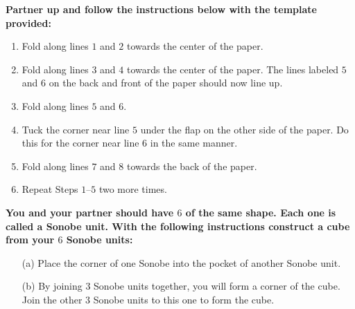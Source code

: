
\newcommand{\activityname}{
  Know When to Fold 'Em
}
\newcommand{\subtitle}{
  Ge-Origam-itry
}



\noindent \textbf{Partner up and follow the instructions below with the template provided:}

\begin{enumerate}
\item Fold along lines $1$ and $2$ towards the center of the paper.
\item Fold along lines $3$ and $4$ towards the center of the paper. The lines labeled $5$ and $6$ on the back and front of the paper should now line up.
\item Fold along lines $5$ and $6$. 
\item Tuck the corner near line $5$ under the flap on the other side of the paper. Do this for the corner near line $6$ in the same manner.
\item Fold along lines $7$ and $8$ towards the back of the paper.
\item Repeat Steps $1$--$5$ two more times.
\end{enumerate}

\noindent \textbf{You and your partner should have $6$ of the same shape. Each one is called a Sonobe unit. With the following instructions construct a cube from your $6$ Sonobe units:}

\begin{enumerate}
\item[(a)] Place the corner of one Sonobe into the pocket of another Sonobe unit. 
\item[(b)] By joining $3$ Sonobe units together, you will form a corner of the cube. Join the other $3$ Sonobe units to this one to form the cube.
\end{enumerate}

